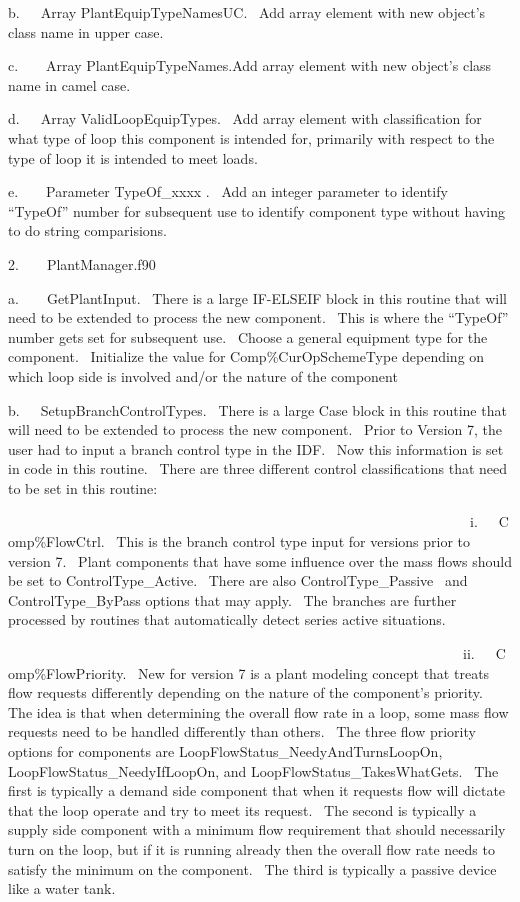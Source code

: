 b.~~~Array PlantEquipTypeNamesUC.~ Add array element with new object's class name in upper case.

c.~~~~Array PlantEquipTypeNames.Add array element with new object's class name in camel case.

d.~~~Array ValidLoopEquipTypes.~ Add array element with classification for what type of loop this component is intended for, primarily with respect to the type of loop it is intended to meet loads.

e.~~~~Parameter TypeOf\_xxxx .~ Add an integer parameter to identify ``TypeOf'' number for subsequent use to identify component type without having to do string comparisions.

2.~~~~PlantManager.f90

a.~~~~GetPlantInput.~ There is a large IF-ELSEIF block in this routine that will need to be extended to process the new component.~ This is where the ``TypeOf'' number gets set for subsequent use.~ Choose a general equipment type for the component.~ Initialize the value for Comp\%CurOpSchemeType depending on which loop side is involved and/or the nature of the component

b.~~~SetupBranchControlTypes.~ There is a large Case block in this routine that will need to be extended to process the new component.~ Prior to Version 7, the user had to input a branch control type in the IDF.~ Now this information is set in code in this routine.~ There are three different control classifications that need to be set in this routine:

~~~~~~~~~~~~~~~~~~~~~~~~~~~~~~~~~~~~~~~~~~~~~~~~~~~~~~~~~~~~~~~~~~i.~~~Comp\%FlowCtrl.~ This is the branch control type input for versions prior to version 7.~ Plant components that have some influence over the mass flows should be set to ControlType\_Active.~ There are also ControlType\_Passive~ and ControlType\_ByPass options that may apply.~ The branches are further processed by routines that automatically detect series active situations.

~~~~~~~~~~~~~~~~~~~~~~~~~~~~~~~~~~~~~~~~~~~~~~~~~~~~~~~~~~~~~~~~~ii.~~~Comp\%FlowPriority.~ New for version 7 is a plant modeling concept that treats flow requests differently depending on the nature of the component's priority.~ The idea is that when determining the overall flow rate in a loop, some mass flow requests need to be handled differently than others.~ The three flow priority options for components are LoopFlowStatus\_NeedyAndTurnsLoopOn, LoopFlowStatus\_NeedyIfLoopOn, and LoopFlowStatus\_TakesWhatGets.~ The first is typically a demand side component that when it requests flow will dictate that the loop operate and try to meet its request.~ The second is typically a supply side component with a minimum flow requirement that should necessarily turn on the loop, but if it is running already then the overall flow rate needs to satisfy the minimum on the component.~ The third is typically a passive device like a water tank.

